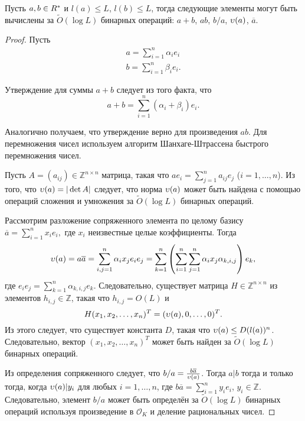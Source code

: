 \documentclass[_00_dissertation.tex]{subfiles}
\begin{document}
\begin{proposition}\label{proposition:operations}
    Пусть $a, b \in R^{*}$ и $l(a) \leq L$, $l(b) \leq L$, тогда следующие элементы могут быть  вычислены за $\tilde{O}(\log L)$ бинарных операций: $a + b$, $a b$, $b/a$, $\upsilon(a)$, $\overline{a}$.
\end{proposition}
\begin{proof}
    Пусть
    \begin{equation*}
        \begin{split}
            a = \sum_{i = 1}^n \alpha_i e_i\\
            b = \sum_{i = 1}^n \beta_i e_i.
        \end{split}
    \end{equation*}

    Утверждение для суммы $a + b$ следует из того факта, что
    \begin{equation*}
        a + b = \sum_{i = 1}^n (\alpha_i + \beta_i) e_i.
    \end{equation*}

    Аналогично получаем, что утверждение верно для произведения $ab$.
    Для перемножения чисел используем алгоритм Шанхаге-Штрассена быстрого перемножения чисел.

    Пусть $A = (a_{ij}) \in \mathbb{Z}^{n \times n}$ матрица, такая что $a e_i = \sum_{j = 1}^n a_{ij}e_j$ ($i=1,\ldots,n$).
    Из того, что $\upsilon(a) = |\det{A}|$ следует, что норма $\upsilon(a)$ может быть найдена с помощью операций сложения и умножения за $\tilde{O}(\log L)$ бинарных операций.

    Рассмотрим разложение сопряженного элемента по целому базису $\overline{a} = \sum_{i = 1}^n x_i e_i,$ где $x_i$ неизвестные целые коэффициенты.
    Тогда
    \begin{equation*}
        \upsilon(a) = a \overline{a} = \sum_{i, j = 1}^n  \alpha_i x_j e_i e_j =
            \sum_{k = 1}^n \left(
                \sum_{i = 1}^n \sum_{j = 1}^n \alpha_i x_j \alpha_{k, i, j}
            \right) e_k,
    \end{equation*}
    где $e_i e_j = \sum_{k=1}^n \alpha_{k, i, j} e_k$.
    Следовательно, существует матрица $H \in \mathbb{Z}^{n \times n}$ из элементов $h_{i, j} \in \mathbb{Z}$, такая что $h_{i, j} = O(L)$ и
    \begin{equation*}
        H(x_1, x_2, \ldots, x_n)^T = (\upsilon(a), 0, \ldots, 0)^T.
    \end{equation*}
    Из этого следует, что существует константа $D$, такая что $\upsilon(a) \le D (l(a))^n$.
    Следовательно, вектор $(x_1, x_2, \ldots, x_n)^T$ может быть найден за $\tilde{O}(\log L)$ бинарных операций.

    Из определения сопряженного следует, что $b/a = \frac{b\overline{a}}{\upsilon(a)}$.
    Тогда $a|b$ тогда и только тогда, когда $\upsilon(a)|y_i$ для любых $i = 1, \ldots, n$, где $b\overline{a} = \sum_{i=1}^n y_i e_i$, $y_i \in \mathbb{Z}$.
    Следовательно, элемент $b/a$ может быть определён за $\tilde{O}(\log L)$ бинарных операций используя произведение в $\mathcal{O}_K$ и деление рациональных чисел. 
\end{proof}
\end{document}

